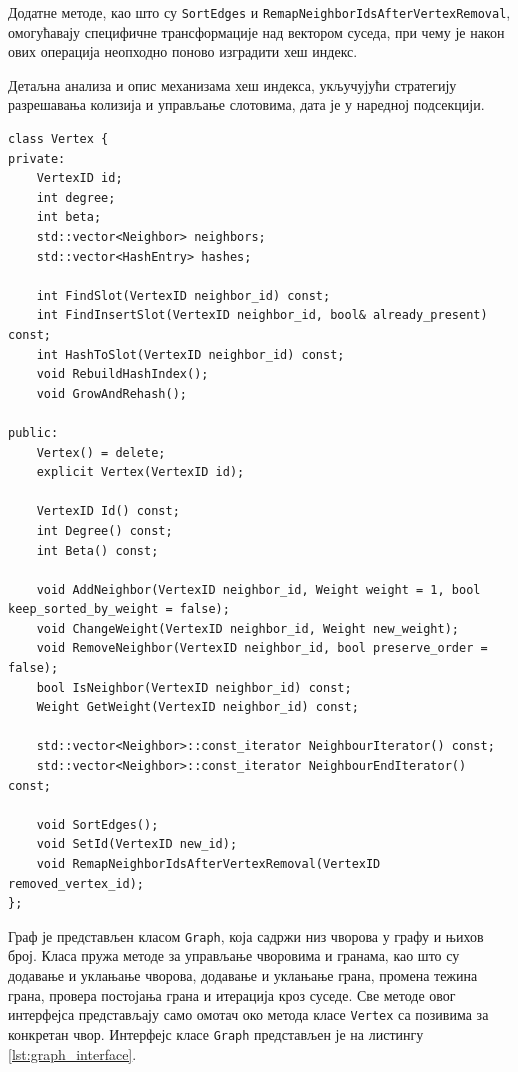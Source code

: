 Додатне методе, као што су \texttt{SortEdges} и \texttt{RemapNeighborIds\allowbreak AfterVertex\allowbreak Removal}, омогућавају специфичне трансформације над вектором суседа, при чему је након ових операција неопходно поново изградити хеш индекс.

Детаљна анализа и опис механизама хеш индекса, укључујући стратегију разрешавања колизија и управљање слотовима, дата је у наредној подсекцији.

\begin{lstlisting}[style=thesiscpp, caption={Интерфејс класе \texttt{Vertex}}, label={lst:vertex_interface}]
class Vertex {
private:
    VertexID id;
    int degree;
    int beta;
    std::vector<Neighbor> neighbors;
    std::vector<HashEntry> hashes;

    int FindSlot(VertexID neighbor_id) const;
    int FindInsertSlot(VertexID neighbor_id, bool& already_present) const;
    int HashToSlot(VertexID neighbor_id) const;
    void RebuildHashIndex();
    void GrowAndRehash();

public:
    Vertex() = delete;
    explicit Vertex(VertexID id);

    VertexID Id() const;
    int Degree() const;
    int Beta() const;

    void AddNeighbor(VertexID neighbor_id, Weight weight = 1, bool keep_sorted_by_weight = false);
    void ChangeWeight(VertexID neighbor_id, Weight new_weight);
    void RemoveNeighbor(VertexID neighbor_id, bool preserve_order = false);
    bool IsNeighbor(VertexID neighbor_id) const;
    Weight GetWeight(VertexID neighbor_id) const;

    std::vector<Neighbor>::const_iterator NeighbourIterator() const;
    std::vector<Neighbor>::const_iterator NeighbourEndIterator() const;

    void SortEdges();
    void SetId(VertexID new_id);
    void RemapNeighborIdsAfterVertexRemoval(VertexID removed_vertex_id);
};
\end{lstlisting}

Граф је представљен класом \texttt{Graph}, која садржи низ чворова у графу и њихов број. Класа пружа методе за управљање чворовима и гранама, као што су додавање и уклањање чворова, додавање и уклањање грана, промена тежина грана, провера постојања грана и итерација кроз суседе. Све методе овог интерфејса представљају само омотач око метода класе \texttt{Vertex} са позивима за конкретан чвор. Интерфејс класе \texttt{Graph} представљен је на листингу \ref{lst:graph_interface}.

